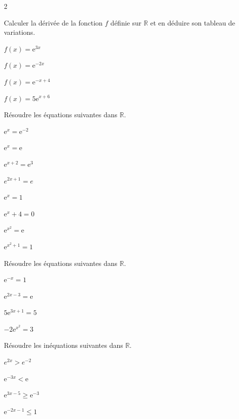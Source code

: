 \documentclass[11pt,a4paper]{article}  %
\begin{document}
\newpage

\begin{multicols}{2}

Calculer la dérivée de la fonction $f$ définie sur $\mathbb{R}$ et en déduire son tableau de variations.
\begin{enumMet}
	\item $f(x)=\mathrm{e}^{3 x}$
	\item $f(x)=\mathrm{e}^{-2 x}$
	\item $f(x)=\mathrm{e}^{-x+4}$
	\item $f(x)=5 \mathrm{e}^{x+6}$
\end{enumMet}


Résoudre les équations suivantes dans $\mathbb{R}$.
\begin{enumMet}
	\item $\mathrm{e}^x=\mathrm{e}^{-2}$
	\item $\mathrm{e}^x=\mathrm{e}$
	\item $\mathrm{e}^{x+2}=\mathrm{e}^3$
	\item $e^{2 x+1}=e$
	\item $\mathrm{e}^x=1$
	\item $\mathrm{e}^x+4=0$
	\item $\mathrm{e}^{x^2}=\mathrm{e}$
	\item $\mathrm{e}^{x^2+1}=1$
\end{enumMet}
\columnbreak


Résoudre les équations suivantes dans $\mathbb{R}$.
\begin{enumMet}
	\item $\mathrm{e}^{-x}=1$
	\item $\mathrm{e}^{2 x-3}=\mathrm{e}$
	\item $5 \mathrm{e}^{3 x+1}=5$
	\item $-2 \mathrm{e}^{x^2}=3$
\end{enumMet}


Résoudre les inéquations suivantes dans $\mathbb{R}$.
\begin{enumMet}
	\item $e^{2 x}>e^{-2}$
	\item $\mathrm{e}^{-3 x}<\mathrm{e}$
	\item $\mathrm{e}^{3 x-5} \geqslant \mathrm{e}^{-3}$
	\item $\mathrm{e}^{-2 x-1} \leqslant 1$
\end{enumMet}
\end{multicols}
\end{document}

